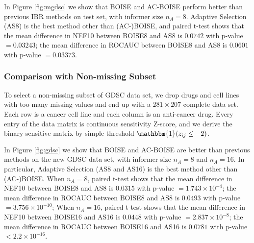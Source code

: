 \documentclass[12pt]{article}
\begin{document}
In Figure \ref{fig:mgdsc} we show that BOISE and AC-BOISE perform better than previous IBR methods on test set, with informer size $n_A = 8$. Adaptive Selection (AS8) is the best method other than (AC-)BOISE, and paired t-test shows that the mean difference in NEF10 between BOISE8 and AS8 is $0.0742$ with p-value $= 0.03243$; the mean difference in ROCAUC between BOISE8 and AS8 is $0.0601$ with p-value $= 0.03373$.

\subsubsection{Comparison with Non-missing Subset}
To select a non-missing subset of GDSC data set, we drop drugs and cell lines with too many missing values and end up with a $281\times 207$ complete data set. Each row is a cancer cell line and each column is an anti-cancer drug. Every entry of the data matrix is continuous sensitivity Z-score, and we derive the binary sensitive matrix by simple threshold $\mathbbm{1}(z_{ij}\leq -2)$. 

In Figure \ref{fig:gdsc} we show that BOISE and AC-BOISE are better than previous methods on the new GDSC data set, with informer size $n_A = 8$ and $n_A = 16$. In particular, Adaptive Selection (AS8 and AS16) is the best method other than (AC-)BOISE. When $n_A = 8$, paired t-test shows that the mean difference in NEF10 between BOISE8 and AS8 is $0.0315$ with p-value $= 1.743\times 10^{-4}$; the mean difference in ROCAUC between BOISE8 and AS8 is $0.0493$ with p-value $= 3.756\times 10^{-10}$; When $n_A = 16$, paired t-test shows that the mean difference in NEF10 between BOISE16 and AS16 is $0.0448$ with p-value $= 2.837\times 10^{-8}$; the mean difference in ROCAUC between BOISE16 and AS16 is $0.0781$ with p-value $<2.2\times 10^{-16}$. 
\end{document}
